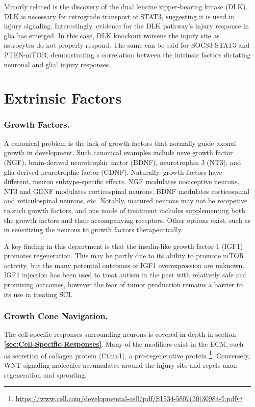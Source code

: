 \documentclass[12pt]{report}
\begin{document}
Minorly related is the discovery of the dual leucine zipper-bearing kinase (DLK). DLK is necessary for retrograde transport of STAT3, suggesting it is used in injury signaling. Interestingly, evidence for the DLK pathway's injury response in glia has emerged. In this case, DLK knockout worsens the injury site as astrocytes do not properly respond. The same can be said for SOCS3-STAT3 and PTEN-mTOR, demonstrating a correlation between the intrinsic factors dictating neuronal and glial injury responses. 


\section{Extrinsic Factors}

\subsubsection{Growth Factors.}

A canonical problem is the lack of growth factors that normally guide axonal growth in development. Such canonical examples include neve growth factor (NGF), brain-derived neurotrophic factor (BDNF), neurotrophin 3 (NT3), and glia-derived neurotrophic factor (GDNF). Naturally, growth factors have different, neuron subtype-specific effects. NGF modulates nociceptive neurons, NT3 and GDNF modulates corticospinal neurons, BDNF modulates corticospinal and reticulospinal neurons, etc. Notably, matured neurons may not be recepetive to such growth factors, and one mode of treatment includes supplementing both the growth factors and their accompanying receptors. Other options exist, such as in sensitizing the neurons to growth factors therapeutically.\newline

A key finding in this department is that the insulin-like growth factor 1 (IGF1) promotes regeneration. This may be partly due to its ability to promote mTOR activity, but the many potential outcomes of IGF1 overexpression are unknown. IGF1 injection has been used to treat autism in the past with relatively safe and promising outcomes, however the fear of tumor production remains a barrier to its use in treating SCI.

\subsubsection{Growth Cone Navigation.}

The cell-specific responses surrounding neurons is covered in-depth in section \textbf{\ref{sec:Cell-Specific-Responses}}. Many of the modifiers exist in the ECM, such as secretion of collagen protein (Cthrc1), a pro-regenerative protein \footnote{\url{https://www.cell.com/developmental-cell/pdf/S1534-5807(20)30984-9.pdf}}. Conversely, WNT signaling molecules accumulates around the injury site and repels axon regeneration and sprouting.\newline 
\end{document}
